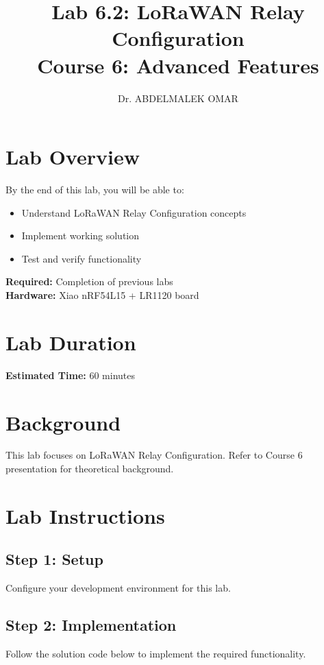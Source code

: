 \documentclass[11pt,a4paper]{article}
\title{\textbf{Lab 6.2: LoRaWAN Relay Configuration}\\
\large Course 6: Advanced Features}
\author{Dr. ABDELMALEK OMAR}
\date{}
\begin{document}
\maketitle
\thispagestyle{fancy}

\section{Lab Overview}

\begin{objectivebox}
By the end of this lab, you will be able to:
\begin{itemize}
    \item Understand LoRaWAN Relay Configuration concepts
    \item Implement working solution
    \item Test and verify functionality
\end{itemize}
\end{objectivebox}

\begin{prereqbox}
\textbf{Required:} Completion of previous labs\\
\textbf{Hardware:} Xiao nRF54L15 + LR1120 board
\end{prereqbox}

\section{Lab Duration}
\textbf{Estimated Time:} 60 minutes

\section{Background}

This lab focuses on LoRaWAN Relay Configuration. Refer to Course 6 presentation for theoretical background.

\section{Lab Instructions}

\subsection{Step 1: Setup}
Configure your development environment for this lab.

\subsection{Step 2: Implementation}
Follow the solution code below to implement the required functionality.
\end{document}
